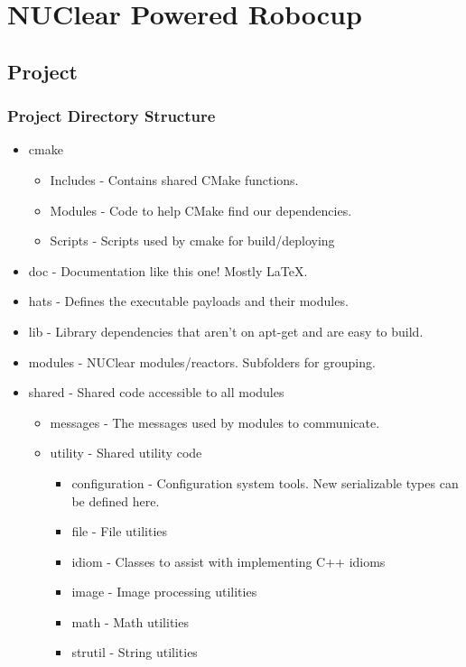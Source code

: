 \documentclass{beamer}
\begin{document}
\section{NUClear Powered Robocup}
\subsection{Project}
\begin{frame}
	\frametitle{Project Directory Structure}
	\footnotesize
	\begin{itemize}
		\item cmake
		\begin{itemize}
			\footnotesize
			\item Includes - Contains shared CMake functions.
			\item Modules -  Code to help CMake find our dependencies.
			\item Scripts - Scripts used by cmake for build/deploying
		\end{itemize}

		\item doc - Documentation like this one! Mostly LaTeX.
		\item hats - Defines the executable payloads and their modules.
		\item lib - Library dependencies that aren't on apt-get and are easy to build.
		\item modules - NUClear modules/reactors. Subfolders for grouping.

		\item shared - Shared code accessible to all modules
		\begin{itemize}
			\footnotesize
			\item messages - The messages used by modules to communicate.
			\item utility - Shared utility code
			\begin{itemize}
				\footnotesize
				\item configuration - Configuration system tools. New serializable types can be defined here.
				\item file - File utilities
				\item idiom - Classes to assist with implementing C++ idioms
				\item image - Image processing utilities
				\item math - Math utilities
				\item strutil - String utilities
			\end{itemize}
		\end{itemize}
	\end{itemize}
\end{frame}
\end{document}
